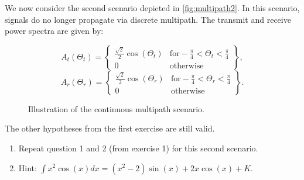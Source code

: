 \documentclass [a4paper, 11pt] {article}
\begin{document}
    \begin{exercise}{2}

         We now consider the second scenario depicted in \autoref{fig:multipath2}. In this scenario, signals do no longer propagate via discrete multipath. The transmit and receive power spectra are given by:

    \vspace{-0.5 cm}
    \begin{multicols}{2}
      \begin{equation}
          A_t(\Theta_t) = \left\{
        \begin{array}{ll}
            \frac{\sqrt{2}}{2}\cos(\Theta_t) & \mbox{for} -\frac{\pi}{4} < \Theta_t < \frac{\pi}{4}\\
            0 & \mbox{otherwise}
        \end{array}
        \right \},
      \end{equation}\break
      \begin{equation}
          A_r(\Theta_r) = \left\{
        \begin{array}{ll}
            \frac{\sqrt{2}}{2}\cos(\Theta_r) & \mbox{for} -\frac{\pi}{4} < \Theta_r < \frac{\pi}{4}\\
            0 & \mbox{otherwise}
        \end{array}
        \right\}.
      \end{equation}
    \end{multicols}

        \begin{figure}[H]
        \centering
        
        \caption{Illustration of the continuous multipath scenario.}
        \label{fig:multipath2}
        \end{figure}


    The other hypotheses from the first exercise are still valid.

    \begin{enumerate}
        \item Repeat question 1 and 2 (from exercise 1) for this second scenario.
        \item[] Hint: $\int x^2\cos(x) dx = (x^2-2)\sin(x)+2x\cos(x) + K$.
    \end{enumerate}

    \end{exercise}
\end{document}
